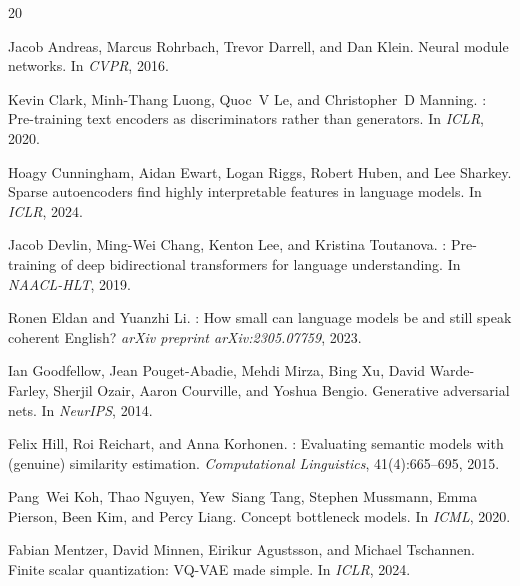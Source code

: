 \documentclass[11pt,a4paper]{article}
\begin{document}


\begin{thebibliography}{20}

Jacob Andreas, Marcus Rohrbach, Trevor Darrell, and Dan Klein.
\newblock Neural module networks.
\newblock In \emph{CVPR}, 2016.

Kevin Clark, Minh-Thang Luong, Quoc~V Le, and Christopher~D Manning.
: Pre-training text encoders as discriminators rather than generators.
\newblock In \emph{ICLR}, 2020.

Hoagy Cunningham, Aidan Ewart, Logan Riggs, Robert Huben, and Lee Sharkey.
\newblock Sparse autoencoders find highly interpretable features in language models.
\newblock In \emph{ICLR}, 2024.

Jacob Devlin, Ming-Wei Chang, Kenton Lee, and Kristina Toutanova.
: Pre-training of deep bidirectional transformers for language understanding.
\newblock In \emph{NAACL-HLT}, 2019.

Ronen Eldan and Yuanzhi Li.
: How small can language models be and still speak coherent {E}nglish?
\newblock \emph{arXiv preprint arXiv:2305.07759}, 2023.

Ian Goodfellow, Jean Pouget-Abadie, Mehdi Mirza, Bing Xu, David Warde-Farley, Sherjil Ozair, Aaron Courville, and Yoshua Bengio.
\newblock Generative adversarial nets.
\newblock In \emph{NeurIPS}, 2014.

Felix Hill, Roi Reichart, and Anna Korhonen.
: Evaluating semantic models with (genuine) similarity estimation.
\newblock \emph{Computational Linguistics}, 41(4):665--695, 2015.

Pang~Wei Koh, Thao Nguyen, Yew~Siang Tang, Stephen Mussmann, Emma Pierson, Been Kim, and Percy Liang.
\newblock Concept bottleneck models.
\newblock In \emph{ICML}, 2020.

Fabian Mentzer, David Minnen, Eirikur Agustsson, and Michael Tschannen.
\newblock Finite scalar quantization: {VQ-VAE} made simple.
\newblock In \emph{ICLR}, 2024.


\end{thebibliography}
\end{document}
